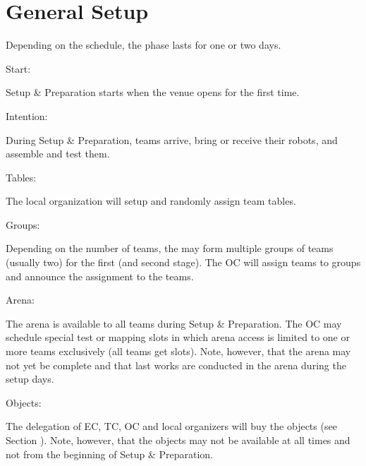 \section{General Setup}
\label{sec:general_setup}
Depending on the schedule, the  phase lasts for one or two days.

\begin{enumerate}
	{\bf\item Start:} Setup \& Preparation starts when the venue opens for the first time.
	{\bf\item Intention:} During Setup \& Preparation, teams arrive, bring or receive their robots, and assemble and test them.
	{\bf\item Tables:} The local organization will setup and randomly assign team tables.
	{\bf\item Groups:} Depending on the number of teams, the  may form multiple groups of teams (usually two) for the first (and second stage). The OC will assign teams to groups and announce the assignment to the teams.
	{\bf\item Arena:} The arena is available to all teams during Setup \& Preparation. The OC may schedule special test or mapping slots in which arena access is limited to one or more teams exclusively (all teams get slots). Note, however, that the arena may not yet be complete and that last works are conducted in the arena during the setup days.
	{\bf\item Objects:} The delegation of EC, TC, OC and local organizers will buy the objects (see Section ). Note, however, that the objects may not be available at all times and not from the beginning of Setup \& Preparation.
\end{enumerate}

